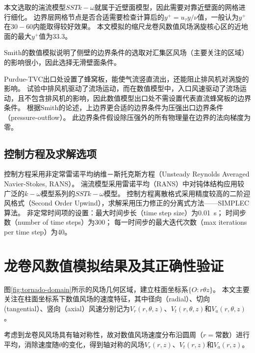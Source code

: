 本文选取的湍流模型$SST k-\omega$就属于近壁面模型，因此需要对靠近壁面的网格进行细化。
边界层网格节点是否合适需要检查计算后的$y^{+}=u_{\tau}y/\nu$值，一般认为$y^{+}$在$30-60$内能取得较好效果。
本文模拟的缩尺龙卷风数值风场涡旋核心区的近地面的最大$y^{+}$值为$33.3$。

Smith的数值模拟\cite{smith1987effect}说明了侧壁的边界条件的选取对汇集区风场（主要关注的区域）的影响很小，因此选择无滑壁面条件。

Purdue-TVC出口处设置了蜂窝板，能使气流竖直流出，还能阻止排风机对涡旋的影响。
试验中排风机驱动了流场运动，而在数值模型中，入口风速驱动了流场运动，且不包含排风机的影响，因此数值模型出口处不需设置代表直流蜂窝板的边界条件。
根据Smith\cite{smith1987effect}的论述，上边界更合适的边界条件为压强出口边界条件（pressure-outflow）。
此边界条件假设除压强外的所有物理量在边界的法向梯度为零\cite{fluent2015user}。

\subsection{控制方程及求解选项}
控制方程采用非定常雷诺平均纳维－斯托克斯方程（Unsteady Reynolds Averaged Navier-Stokes, RANS）。
湍流模型采用雷诺平均（RANS）中对钝体结构应用较广泛的$k-\omega$模型系列的$SST k-\omega$模型。
控制方程离散格式采用精度较高的二阶迎风格式（Second Order Upwind），求解采用压力修正的分离式方法——SIMPLEC算法。
非定常时间项的设置：最大时间步长（time step size）为\SI{0.01}{s}；
时间步数（number of time steps）为300；
每一时间步的最大迭代次数（max iterations per time step）为40。

\section{龙卷风数值模拟结果及其正确性验证}\label{sec:tornado}
图\ref{fig:tornado-domain}所示的风场几何区域，建立柱面坐标系$\{O:r \theta z\}$。
本文主要关注在柱面坐标系下数值风场的速度特征，其中径向（radial）、切向(tangential）、竖向（axial）风速分别记为$V_r(r,\theta,z)$、$V_t(r,\theta,z)$和$V_a(r,\theta,z)$。

考虑到龙卷风风场具有轴对称性，故对数值风场速度分布沿圆周（$r=$常数）进行平均，消除速度随$\theta$的变化，得到轴对称的风场$V_r(r,z)$、$V_t(r,z)$和$V_a(r,z)$。


